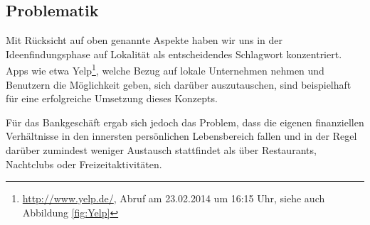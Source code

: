 
\subsection{Problematik}
	Mit Rücksicht auf oben genannte Aspekte haben wir uns in der Ideenfindungsphase auf Lokalität als entscheidendes Schlagwort konzentriert. Apps wie etwa Yelp\footnote{\url{http://www.yelp.de/}, Abruf am 23.02.2014 um 16:15 Uhr, siehe auch Abbildung \ref{fig:Yelp}}, welche Bezug auf lokale Unternehmen nehmen und Benutzern die Möglichkeit geben, sich darüber auszutauschen, sind beispielhaft für eine erfolgreiche Umsetzung dieses Konzepts.
	
	Für das Bankgeschäft ergab sich jedoch das Problem, dass die eigenen finanziellen Verhältnisse in den innersten persönlichen Lebensbereich fallen und in der Regel darüber zumindest weniger Austausch stattfindet als über Restaurants, Nachtclubs oder Freizeitaktivitäten. 

